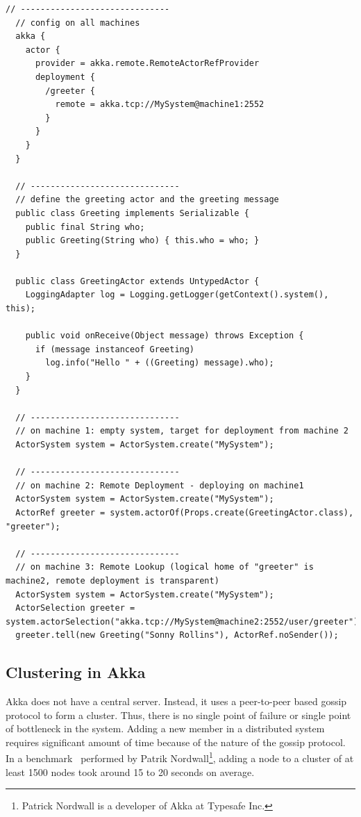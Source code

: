 \begin{lstlisting}[caption=A sample Akka Configuration and Code for Remote Actors~\cite{akkaHome}, label=lst:akkaRemoting]
  // ------------------------------
  // config on all machines
  akka {
    actor {
      provider = akka.remote.RemoteActorRefProvider
      deployment {
        /greeter {
          remote = akka.tcp://MySystem@machine1:2552
        }
      }
    }
  }

  // ------------------------------
  // define the greeting actor and the greeting message
  public class Greeting implements Serializable {
    public final String who;
    public Greeting(String who) { this.who = who; }
  }

  public class GreetingActor extends UntypedActor {
    LoggingAdapter log = Logging.getLogger(getContext().system(), this);

    public void onReceive(Object message) throws Exception {
      if (message instanceof Greeting)
        log.info("Hello " + ((Greeting) message).who);
    }
  }

  // ------------------------------
  // on machine 1: empty system, target for deployment from machine 2
  ActorSystem system = ActorSystem.create("MySystem");

  // ------------------------------
  // on machine 2: Remote Deployment - deploying on machine1
  ActorSystem system = ActorSystem.create("MySystem");
  ActorRef greeter = system.actorOf(Props.create(GreetingActor.class), "greeter");

  // ------------------------------
  // on machine 3: Remote Lookup (logical home of "greeter" is machine2, remote deployment is transparent)
  ActorSystem system = ActorSystem.create("MySystem");
  ActorSelection greeter = system.actorSelection("akka.tcp://MySystem@machine2:2552/user/greeter");
  greeter.tell(new Greeting("Sonny Rollins"), ActorRef.noSender());
\end{lstlisting}

  \subsection{Clustering in Akka}
  Akka does not have a central server. Instead, it uses a peer-to-peer based gossip protocol to form a cluster. Thus, there is no single point of failure or single point of bottleneck in the system. Adding a new member in a distributed system requires significant amount of time because of the nature of the gossip protocol. In a benchmark~\cite{akkaBenchmark} performed by Patrik Nordwall\footnote{Patrick Nordwall is a developer of Akka at Typesafe Inc.}, adding a node to a cluster of at least 1500 nodes took around 15 to 20 seconds on average.


